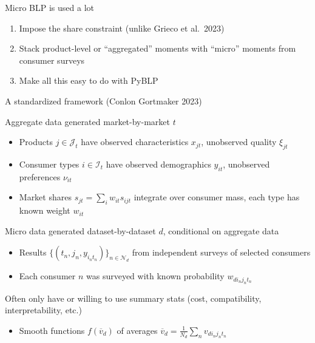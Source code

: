 \begin{frame}{Micro BLP is used a lot}
\begin{wideitemize}
        \begin{enumerate}
            \item Impose the \cite{berry1995automobile} share constraint (unlike {\color{light gray}Grieco et al.\ 2023}) \nocite{grieco2023conformant}
            \item Stack product-level or ``\alert{aggregated}'' moments with ``\alert{micro}'' moments from consumer surveys
            \item Make all this easy to do with \alert{PyBLP}
        \end{enumerate}
    \end{wideitemize}
\end{frame}

\begin{frame}[label=framework]{A standardized framework (Conlon Gortmaker 2023)}
    \begin{wideitemize}
        
        \item Aggregate data generated market-by-market $t$
        \begin{itemize}
            \item \alert{Products} $j \in \mathcal{J}_t$ have observed characteristics $x_{jt}$, unobserved quality $\xi_{jt}$
            \item \alert{Consumer types} $i \in \mathcal{I}_t$ have observed demographics $y_{it}$, unobserved preferences $\nu_{it}$
            \item \alert{Market shares} $s_{jt} = \sum_i w_{it} s_{ijt}$ integrate over consumer mass, each type has known weight $w_{it}$
        \end{itemize}
        
        \item Micro data generated dataset-by-dataset $d$, conditional on aggregate data
        \begin{itemize}
            \item Results $\{(t_n, j_n, y_{i_nt_n})\}_{n \in \mathcal{N}_d}$ from \alert{independent surveys} of \alert{selected consumers}
            \item Each consumer $n$ was surveyed with known probability $w_{di_nj_nt_n}$
        \end{itemize}
        
        \item Often only have or willing to use \alert{summary stats} (cost, compatibility, interpretability, etc.)
        \begin{itemize}
            \item Smooth functions $f(\overline{v}_d)$ of averages $\overline{v}_d = \frac{1}{N_d} \sum_n v_{di_nj_nt_n}$
        \end{itemize}
        

\end{wideitemize}
\end{frame}
